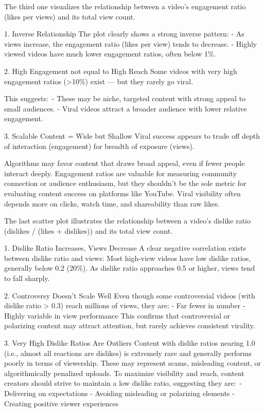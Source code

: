 \documentclass[a4paper]{article}
\begin{document}
\begin{multicols}{2}
The third one visualizes the relationship between a video’s engagement ratio (likes per views) and its total view count.

1. Inverse Relationship
The plot clearly shows a strong inverse pattern:
- As views increase, the engagement ratio (likes per view) tends to decrease.
- Highly viewed videos have much lower engagement ratios, often below 1\%.

 2. High Engagement not equal to High Reach
Some videos with very high engagement ratios (>10\%) exist — but they rarely go viral.

This suggests:\
- These may be niche, targeted content with strong appeal to small audiences.
- Viral videos attract a broader audience with lower relative engagement.

 3. Scalable Content = Wide but Shallow
Viral success appears to trade off depth of interaction (engagement) for breadth of exposure (views).

Algorithms may favor content that draws broad appeal, even if fewer people interact deeply.
Engagement ratios are valuable for measuring community connection or audience enthusiasm, but they shouldn’t be the sole metric for evaluating content success on platforms like YouTube. Viral visibility often depends more on clicks, watch time, and shareability than raw likes.



The last scatter plot illustrates the relationship between a video’s dislike ratio (dislikes / (likes + dislikes)) and its total view count.

1. Dislike Ratio Increases, Views Decrease
A clear negative correlation exists between dislike ratio and views:
Most high-view videos have low dislike ratios, generally below 0.2 (20\%).
As dislike ratio approaches 0.5 or higher, views tend to fall sharply.

2. Controversy Doesn’t Scale Well
Even though some controversial videos (with dislike ratio > 0.3) reach millions of views, they are:
- Far fewer in number
- Highly variable in view performance
This confirms that controversial or polarizing content may attract attention, but rarely achieves consistent virality.

3. Very High Dislike Ratios Are Outliers
Content with dislike ratios nearing 1.0 (i.e., almost all reactions are dislikes) is extremely rare and generally performs poorly in terms of viewership.
These may represent scams, misleading content, or algorithmically penalized uploads.
To maximize visibility and reach, content creators should strive to maintain a low dislike ratio, suggesting they are:\
- Delivering on expectations
- Avoiding misleading or polarizing elements
- Creating positive viewer experiences



\end{multicols}
\end{document}
